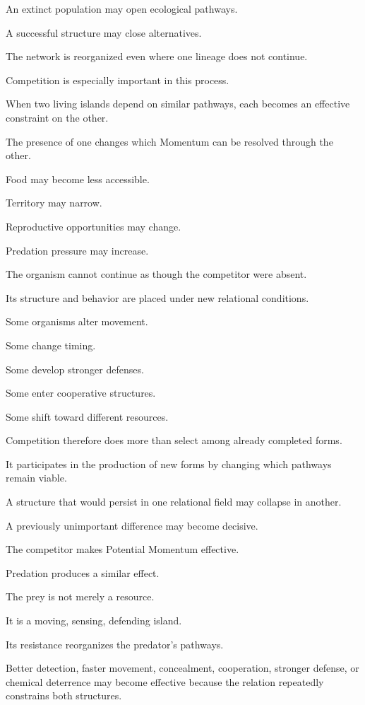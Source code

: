 An extinct population may open ecological pathways.

A successful structure may close alternatives.

The network is reorganized even where one lineage does not continue.

Competition is especially important in this process.

When two living islands depend on similar pathways, each becomes an effective constraint on the other.

The presence of one changes which Momentum can be resolved through the other.

Food may become less accessible.

Territory may narrow.

Reproductive opportunities may change.

Predation pressure may increase.

The organism cannot continue as though the competitor were absent.

Its structure and behavior are placed under new relational conditions.

Some organisms alter movement.

Some change timing.

Some develop stronger defenses.

Some enter cooperative structures.

Some shift toward different resources.

Competition therefore does more than select among already completed forms.

It participates in the production of new forms by changing which pathways remain viable.

A structure that would persist in one relational field may collapse in another.

A previously unimportant difference may become decisive.

The competitor makes Potential Momentum effective.

Predation produces a similar effect.

The prey is not merely a resource.

It is a moving, sensing, defending island.

Its resistance reorganizes the predator’s pathways.

Better detection, faster movement, concealment, cooperation, stronger defense, or chemical deterrence may become effective because the relation repeatedly constrains both structures.

